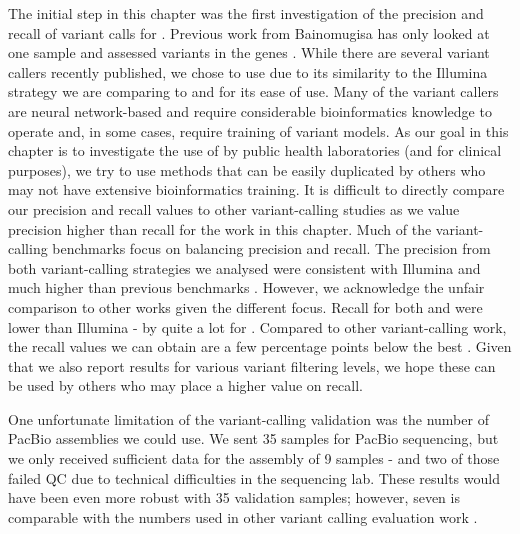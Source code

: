 The initial step in this chapter was the first investigation of the precision and recall of \ont{} variant calls for \mtb{}. Previous work from Bainomugisa \etal{} has only looked at one sample and assessed variants in the \ppe{} genes \cite{bainomugisa2018}. While there are several \ont{} variant callers recently published, we chose to use \bcftools{} due to its similarity to the Illumina strategy we are comparing to and for its ease of use. Many of the \ont{} variant callers are neural network-based and require considerable bioinformatics knowledge to operate and, in some cases, require training of variant models. As our goal in this chapter is to investigate the use of \ont{} by public health laboratories (and for clinical purposes), we try to use methods that can be easily duplicated by others who may not have extensive bioinformatics training. It is difficult to directly compare our precision and recall values to other \ont{} variant-calling studies as we value precision higher than recall for the work in this chapter. Much of the \ont{} variant-calling benchmarks focus on balancing precision and recall. The precision from both \ont{} variant-calling strategies we analysed were consistent with Illumina and much higher than previous \ont{} benchmarks \cite{clair2020,clairvoyant2019}. However, we acknowledge the unfair comparison to other works given the different focus. Recall for both \bcftools{} and \pandora{} were lower than Illumina - by quite a lot for \pandora{}. Compared to other \ont{} variant-calling work, the recall values we can obtain are a few percentage points below the best \cite{sanderson2020,clair2020}. Given that we also report results for various variant filtering levels, we hope these can be used by others who may place a higher value on recall.

One unfortunate limitation of the variant-calling validation was the number of PacBio assemblies we could use. We sent 35 samples for PacBio sequencing, but we only received sufficient data for the assembly of 9 samples - and two of those failed QC due to technical difficulties in the sequencing lab. These results would have been even more robust with 35 validation samples; however, seven is comparable with the numbers used in other \ont{} variant calling evaluation work \cite{sanderson2020,clair2020,clairvoyant2019}.

